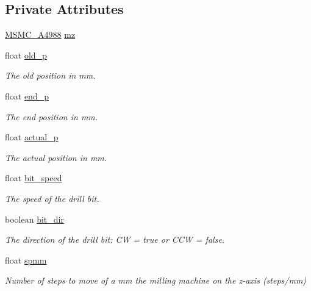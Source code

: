 \subsection*{Private Attributes}
\begin{DoxyCompactItemize}
\item 
\hyperlink{class_m_s_m_c___a4988}{M\+S\+M\+C\+\_\+\+A4988} \hyperlink{class_milling_machine_a65ad29e41f924a1c2de233efdd21963c}{mz}
\item 
float \hyperlink{class_milling_machine_a0224577fdd0206396817cdd62334f3b6}{old\+\_\+p}
\begin{DoxyCompactList}\small\item\em The old position in mm. \end{DoxyCompactList}\item 
float \hyperlink{class_milling_machine_a20735dbad8367b9e46380de13d1c0ae3}{end\+\_\+p}
\begin{DoxyCompactList}\small\item\em The end position in mm. \end{DoxyCompactList}\item 
float \hyperlink{class_milling_machine_a45a16666c6cf4a33f3279e459d5de089}{actual\+\_\+p}
\begin{DoxyCompactList}\small\item\em The actual position in mm. \end{DoxyCompactList}\item 
float \hyperlink{class_milling_machine_ab82a92b8eeab7eb5e820314a7ac01dd8}{bit\+\_\+speed}
\begin{DoxyCompactList}\small\item\em The speed of the drill bit. \end{DoxyCompactList}\item 
boolean \hyperlink{class_milling_machine_a5ce9e8b53197142881889d113424f3be}{bit\+\_\+dir}
\begin{DoxyCompactList}\small\item\em The direction of the drill bit\+: C\+W = true or C\+C\+W = false. \end{DoxyCompactList}\item 
float \hyperlink{class_milling_machine_a774f8f3491b4888cd9418c745e922199}{spmm}
\begin{DoxyCompactList}\small\item\em Number of steps to move of a mm the milling machine on the z-\/axis (steps/mm) \end{DoxyCompactList}\item 

\end{DoxyCompactItemize}
